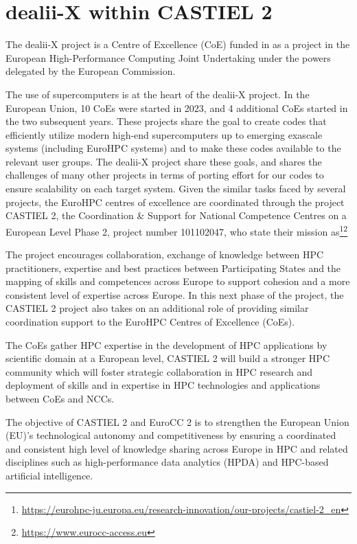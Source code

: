 \documentclass[a4paper,12pt]{article}
\begin{document}
\vspace*{2cm}

\disclaimer

\newpage


\newpage
\section{dealii-X within CASTIEL 2}

The dealii-X project is a Centre of Excellence (CoE) funded in as a project in
the European High-Performance Computing Joint Undertaking under the powers
delegated by the European Commission.

The use of supercomputers is at the heart of the dealii-X project. In the
European Union, 10 CoEs were started in 2023, and 4 additional CoEs started in
the two subsequent years. These projects share the goal to create codes that
efficiently utilize modern high-end supercomputers up to emerging exascale
systems (including EuroHPC systems) and to make these codes available to the
relevant user groups. The dealii-X project share these goals, and shares the
challenges of many other projects in terms of porting effort for our codes to
ensure scalability on each target system. Given the similar tasks faced by
several projects, the EuroHPC centres of excellence are coordinated through
the project CASTIEL 2, the Coordination \& Support for National Competence
Centres on a European Level Phase 2, project number 101102047, who state
their mission
as\footnote{\url{https://eurohpc-ju.europa.eu/research-innovation/our-projects/castiel-2_en}}\footnote{\url{https://www.eurocc-access.eu}}
\begin{center}
  \begin{minipage}{0.8\textwidth}
    The project encourages collaboration, exchange of knowledge between HPC
    practitioners, expertise and best practices between Participating States
    and the mapping of skills and competences across Europe to support
    cohesion and a more consistent level of expertise across Europe. In this
    next phase of the project, the CASTIEL 2 project also takes on an
    additional role of providing similar coordination support to the EuroHPC
    Centres of Excellence (CoEs).

    The CoEs gather HPC expertise in the development of HPC applications by
    scientific domain at a European level, CASTIEL 2 will build a stronger HPC
    community which will foster strategic collaboration in HPC research and
    deployment of skills and in expertise in HPC technologies and applications
    between CoEs and NCCs.
  \end{minipage}

  \begin{minipage}{0.8\textwidth}
    The objective of CASTIEL 2 and EuroCC 2 is to strengthen the European
    Union (EU)’s technological autonomy and competitiveness by ensuring a
    coordinated and consistent high level of knowledge sharing across Europe
    in HPC and related disciplines such as high-performance data analytics
    (HPDA) and HPC-based artificial intelligence.
  \end{minipage}
\end{center}
\end{document}

